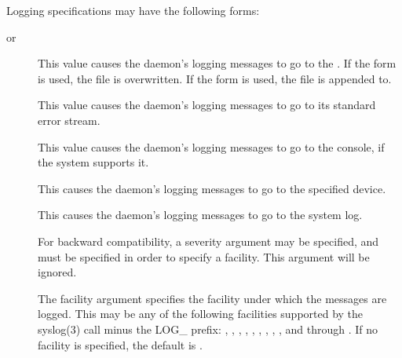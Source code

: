 \documentclass[letterpaper,10pt,english]{sphinxmanual}
\begin{document}
\sphinxAtStartPar
Logging specifications may have the following forms:
\begin{description}
\item[{ or }] \leavevmode
\sphinxAtStartPar
This value causes the daemon’s logging messages to go to the
.  If the \sphinxcode{\sphinxupquote{=}} form is used, the file is overwritten.
If the \sphinxcode{\sphinxupquote{:}} form is used, the file is appended to.

\item[{}] \leavevmode
\sphinxAtStartPar
This value causes the daemon’s logging messages to go to its
standard error stream.

\item[{}] \leavevmode
\sphinxAtStartPar
This value causes the daemon’s logging messages to go to the
console, if the system supports it.

\item[{}] \leavevmode
\sphinxAtStartPar
This causes the daemon’s logging messages to go to the specified
device.

\item[{\sphinxstylestrong{SYSLOG}{[}\sphinxstylestrong{:}\sphinxstyleemphasis{severity}{[}\sphinxstylestrong{:}\sphinxstyleemphasis{facility}{]}{]}}] \leavevmode
\sphinxAtStartPar
This causes the daemon’s logging messages to go to the system log.

\sphinxAtStartPar
For backward compatibility, a severity argument may be specified,
and must be specified in order to specify a facility.  This
argument will be ignored.

\sphinxAtStartPar
The facility argument specifies the facility under which the
messages are logged.  This may be any of the following facilities
supported by the syslog(3) call minus the LOG\_ prefix: ,
, , , , , ,
, , and  through .  If no
facility is specified, the default is .

\end{description}
\end{document}
